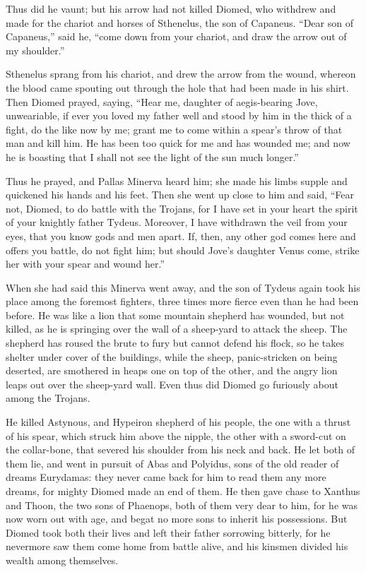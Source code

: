 Thus did he vaunt; but his arrow had not killed Diomed, who withdrew and
made for the chariot and horses of Sthenelus, the son of Capaneus. “Dear
son of Capaneus,” said he, “come down from your chariot, and draw the
arrow out of my shoulder.”

Sthenelus sprang from his chariot, and drew the arrow from the wound,
whereon the blood came spouting out through the hole that had been made in
his shirt. Then Diomed prayed, saying, “Hear me, daughter of aegis-bearing
Jove, unweariable, if ever you loved my father well and stood by him in
the thick of a fight, do the like now by me; grant me to come within a
spear’s throw of that man and kill him. He has been too quick for me and
has wounded me; and now he is boasting that I shall not see the light of
the sun much longer.”

Thus he prayed, and Pallas Minerva heard him; she made his limbs supple
and quickened his hands and his feet. Then she went up close to him and
said, “Fear not, Diomed, to do battle with the Trojans, for I have set in
your heart the spirit of your knightly father Tydeus. Moreover, I have
withdrawn the veil from your eyes, that you know gods and men apart. If,
then, any other god comes here and offers you battle, do not fight him;
but should Jove’s daughter Venus come, strike her with your spear and
wound her.”

When she had said this Minerva went away, and the son of Tydeus again took
his place among the foremost fighters, three times more fierce even than
he had been before. He was like a lion that some mountain shepherd has
wounded, but not killed, as he is springing over the wall of a sheep-yard
to attack the sheep. The shepherd has roused the brute to fury but cannot
defend his flock, so he takes shelter under cover of the buildings, while
the sheep, panic-stricken on being deserted, are smothered in heaps one on
top of the other, and the angry lion leaps out over the sheep-yard wall.
Even thus did Diomed go furiously about among the Trojans.

He killed Astynous, and Hypeiron shepherd of his people, the one with a
thrust of his spear, which struck him above the nipple, the other with a
sword-cut on the collar-bone, that severed his shoulder from his neck and
back. He let both of them lie, and went in pursuit of Abas and Polyidus,
sons of the old reader of dreams Eurydamas: they never came back for him
to read them any more dreams, for mighty Diomed made an end of them. He
then gave chase to Xanthus and Thoon, the two sons of Phaenops, both of
them very dear to him, for he was now worn out with age, and begat no more
sons to inherit his possessions. But Diomed took both their lives and left
their father sorrowing bitterly, for he nevermore saw them come home from
battle alive, and his kinsmen divided his wealth among themselves.

